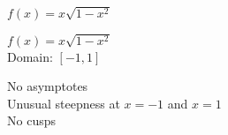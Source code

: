 {$f(x) = x \sqrt{1-x^2}$}
{$f(x) = x\sqrt{1-x^2}$\\
Domain: $[-1,1]$\\
\begin{center}
\end{center}

No asymptotes\\
Unusual steepness at $x = -1$ and $x = 1$\\
No cusps\\

\begin{center}
\end{center}}


